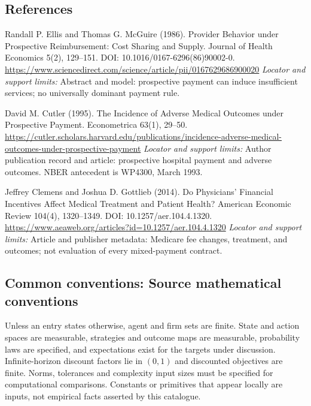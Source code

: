 \documentclass[11pt,a4paper]{article}
\begin{document}
\subsection*{References}
\begin{enumerate}[label={[S\arabic*]},leftmargin=*,itemsep=0.6em]
\item Randall P. Ellis and Thomas G. McGuire (1986). Provider Behavior under Prospective Reimbursement: Cost Sharing and Supply. Journal of Health Economics 5(2), 129--151. DOI: 10.1016/0167-6296(86)90002-0.
\url{https://www.sciencedirect.com/science/article/pii/0167629686900020}
\newline\emph{Locator and support limits:} Abstract and model: prospective payment can induce insufficient services; no universally dominant payment rule.
\item David M. Cutler (1995). The Incidence of Adverse Medical Outcomes under Prospective Payment. Econometrica 63(1), 29--50.
\url{https://cutler.scholars.harvard.edu/publications/incidence-adverse-medical-outcomes-under-prospective-payment}
\newline\emph{Locator and support limits:} Author publication record and article: prospective hospital payment and adverse outcomes. NBER antecedent is WP4300, March 1993.
\item Jeffrey Clemens and Joshua D. Gottlieb (2014). Do Physicians’ Financial Incentives Affect Medical Treatment and Patient Health? American Economic Review 104(4), 1320--1349. DOI: 10.1257/aer.104.4.1320.
\url{https://www.aeaweb.org/articles?id=10.1257/aer.104.4.1320}
\newline\emph{Locator and support limits:} Article and publisher metadata: Medicare fee changes, treatment, and outcomes; not evaluation of every mixed-payment contract.
\end{enumerate}

\subsection*{Common conventions: Source mathematical conventions}

Unless an entry states otherwise, agent and firm sets are finite. State and action spaces are measurable, strategies and outcome maps are measurable, probability laws are specified, and expectations exist for the targets under discussion. Infinite-horizon discount factors lie in $(0,1)$ and discounted objectives are finite. Norms, tolerances and complexity input sizes must be specified for computational comparisons. Constants or primitives that appear locally are inputs, not empirical facts asserted by this catalogue.
\end{document}
